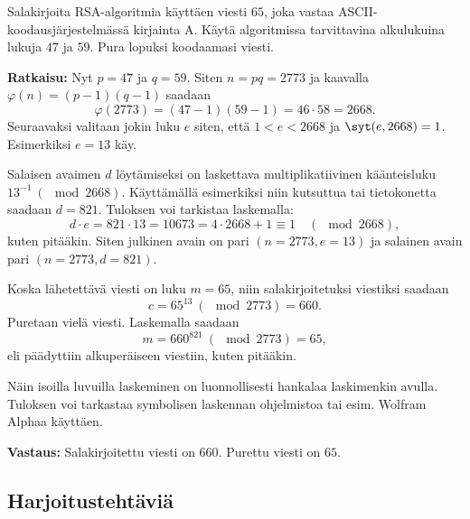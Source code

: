 \begin{esimerkki}
Salakirjoita RSA-algoritmia käyttäen viesti $65$, joka vastaa ASCII-koodausjärjestelmässä kirjainta A. Käytä algoritmissa tarvittavina alkulukuina lukuja $47$ ja $59$. Pura lopuksi koodaamasi viesti.

{\bf Ratkaisu:} 
Nyt $p = 47$ ja $q = 59$. Siten $n=pq=2773$ ja kaavalla $\varphi(n)=(p-1)(q-1)$ saadaan
\[
\varphi(2773)=(47-1)(59-1)=46\cdot 58 =2668.
\]
Seuraavaksi valitaan jokin luku $e$ siten, että $1<e<2668$ ja $\syt(e, 2668)=1$. Esimerkiksi $e=13$ käy.

Salaisen avaimen $d$ löytämiseksi on laskettava multiplikatiivinen käänteisluku $13^{-1}\ (\mod 2668)$. Käyttämällä esimerkiksi niin kutsuttua  tai tietokonetta saadaan $d=821$. Tuloksen voi tarkistaa laskemalla:
\[
d \cdot e = 821 \cdot 13 = 10673 = 4\cdot 2668 + 1 \equiv 1 \quad (\mod 2668),
\]
kuten pitääkin. Siten julkinen avain on pari $(n=2773, e=13)$ ja salainen avain pari $(n=2773, d=821)$.

Koska lähetettävä viesti on luku $m=65$, niin salakirjoitetuksi viestiksi saadaan
\[
c= 65^{13}\ (\mod  2773) = 660.
\]
Puretaan vielä viesti. Laskemalla saadaan
\[
m=660^{821}\ (\mod  2773) = 65,
\]
eli päädyttiin alkuperäiseen viestiin, kuten pitääkin.

Näin isoilla luvuilla laskeminen on luonnollisesti hankalaa laskimenkin avulla. Tuloksen voi tarkastaa symbolisen laskennan ohjelmistoa tai esim. Wolfram Alphaa käyttäen. 

{\bf Vastaus:} Salakirjoitettu viesti on $660$. Purettu viesti on $65$.
\end{esimerkki}



\newpage
\subsection*{Harjoitustehtäviä}

